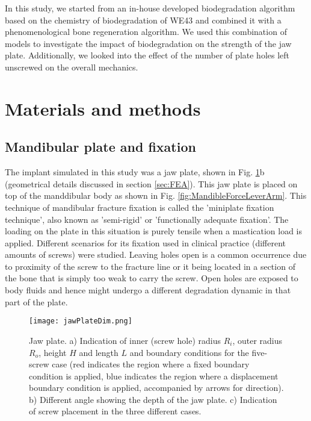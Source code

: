 In this study, we started from an in-house developed biodegradation algorithm based on the chemistry of biodegradation of WE43 and combined it with a phenomenological bone regeneration algorithm. We used this combination of models to investigate the impact of biodegradation on the strength of the jaw plate. Additionally, we looked into the effect of the number of plate holes left unscrewed on the overall mechanics.


\section{Materials and methods}

\subsection{Mandibular plate and fixation}

The implant simulated in this study was a jaw plate, shown in Fig. \ref{fig:jawPlateDim}b (geometrical details discussed in section \ref{sec:FEA}). This jaw plate is placed on top of the manddibular body as shown in Fig. \ref{fig:MandibleForceLeverArm}. This technique of mandibular fracture fixation is called the 'miniplate fixation technique', also known as 'semi-rigid' or 'functionally adequate fixation'. The loading on the plate in this situation is purely tensile when a mastication load is applied. Different scenarios for its fixation used in clinical practice (different amounts of screws) were studied. Leaving holes open is a common occurrence due to proximity of the screw to the fracture line or it being located in a section of the bone that is simply too weak to carry the screw. Open holes are exposed to body fluids and hence might undergo a different degradation dynamic in that part of the plate.

\begin{figure}[h]
    \centering
    \medskip
    \texttt{[image: jawPlateDim.png]}
    \caption[Indication of dimensions and screws placement on the jaw plate]{Jaw plate. a) Indication of inner (screw hole) radius $R_i$, outer radius $R_o$, height $H$ and length $L$ and boundary conditions for the five-screw case (red indicates the region where a fixed boundary condition is applied, blue indicates the region where a displacement boundary condition is applied, accompanied by arrows for direction). b) Different angle showing the depth of the jaw plate. c) Indication of screw placement in the three different cases.}
    \label{fig:jawPlateDim}
\end{figure}

